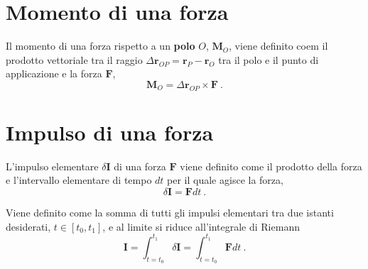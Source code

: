 \section{Momento di una forza}
\begin{definition} Il momento di una forza rispetto a un \textbf{polo} $O$, $\mathbf{M}_O$, viene definito coem il prodotto vettoriale tra il raggio $\Delta \mathbf{r}_{OP} = \mathbf{r}_P - \mathbf{r}_O$ tra il polo e il punto di applicazione e la forza $\mathbf{F}$,
    \begin{equation} \mathbf{M}_O = \Delta \mathbf{r}_{OP} \times \mathbf{F} \ .
    \end{equation}
\end{definition}

\section{Impulso di una forza}
\begin{definition}
    L'impulso elementare $\delta \mathbf{I}$ di una forza $\mathbf{F}$ viene definito come il prodotto della forza e l'intervallo elementare di tempo $dt$ per il quale agisce la forza,
    \begin{equation}
        \delta \mathbf{I} = \mathbf{F} dt \ .
    \end{equation}
\end{definition}
\begin{definition} Viene definito come la somma di tutti gli impulsi elementari tra due istanti desiderati,  $t \in [t_0, t_1]$, e al limite si riduce all'integrale di Riemann
    \begin{equation}
        \mathbf{I} = \int_{t=t_0}^{t_1} \delta \mathbf{I} = \int_{t=t_0}^{t_1} \mathbf{F} dt \ .
    \end{equation}
\end{definition}

